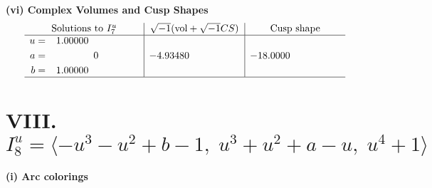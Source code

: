 \documentclass[1p]{elsarticle_modified}
\theoremstyle{definition}
\newcommand{\I}{\sqrt{-1}}
\begin{document}
\newpage\flushleft \textbf{(vi) Complex Volumes and Cusp Shapes}
$$\begin{array}{c|c|c}  
\text{Solutions to }I^u_{7}& \I (\text{vol} + \sqrt{-1}CS) & \text{Cusp shape}\\
 \hline 
\begin{aligned}
u &= \phantom{-}1.00000\phantom{ +0.000000I} \\
a &= \phantom{-0.000000 } 0 \\
b &= \phantom{-}1.00000\phantom{ +0.000000I}\end{aligned}
 & -4.93480\phantom{ +0.000000I} & -18.0000\phantom{ +0.000000I}\\
 \hline 
 \end{array}$$\newpage\newpage\renewcommand{\arraystretch}{1}
\centering \section*{VIII. $I^u_{8}= \langle - u^3- u^2+b-1,\;u^3+u^2+a- u,\;u^4+1 \rangle$}
\flushleft \textbf{(i) Arc colorings}\\
\end{document}
